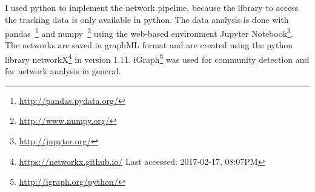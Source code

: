 I used python to implement the network pipeline, because the library to access the tracking data is only available in python.
The data analysis is done with pandas~\footnote{\url{http://pandas.pydata.org/}} and numpy~\footnote{\url{http://www.numpy.org/}} using the web-based environment Jupyter Notebook\footnote{\url{http://jupyter.org/}}.
The networks are saved in graphML format and are created using the python library networkX\footnote{\url{https://networkx.github.io/} Last accessed: 2017-02-17, 08:07PM}  in version 1.11. iGraph\footnote{\url{http://igraph.org/python/}} was used for community detection and for network analysis in general.
